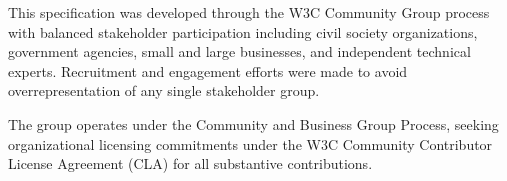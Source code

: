 
This specification was developed through the W3C Community Group process with balanced stakeholder participation including civil society organizations, government agencies, small and large businesses, and independent technical experts. Recruitment and engagement efforts were made to avoid overrepresentation of any single stakeholder group.

\begin{normative}[title=W3C Community Group Process]
The group operates under the Community and Business Group Process, seeking organizational licensing commitments under the W3C Community Contributor License Agreement (CLA) for all substantive contributions.
\end{normative}